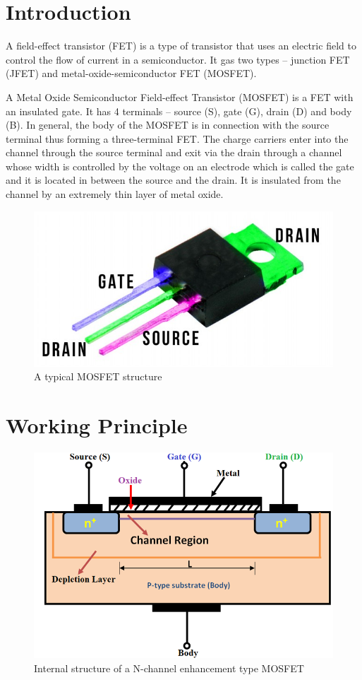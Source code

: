 \section*{Introduction}
A field-effect transistor (FET) is a type of transistor that uses an electric field to control the flow of current in a semiconductor. It gas two types -- junction FET (JFET) and metal-oxide-semiconductor FET (MOSFET). 

A Metal Oxide Semiconductor Field-effect Transistor (MOSFET) is a FET with an insulated gate. It has 4 terminals -- source (S), gate (G), drain (D) and body (B). In general, the body of the MOSFET is in connection with the source terminal thus forming a three-terminal FET. The charge carriers enter into the channel through the source terminal and exit via the drain through a channel whose width is controlled by the voltage on an electrode which is called the gate and it is located in between the source and the drain. It is insulated from the channel by an extremely thin layer of metal oxide.

\begin{figure}[H]
    \centering
    \includegraphics[width=0.4\columnwidth]{images/real.jpg}
    \caption{A typical MOSFET structure}
\end{figure}

\section*{Working Principle}

\begin{figure}[H]
    \centering
    \includegraphics[width=0.55\columnwidth]{images/str.png}
    \caption{Internal structure of a N-channel enhancement type MOSFET}
    \label{str}
\end{figure}

